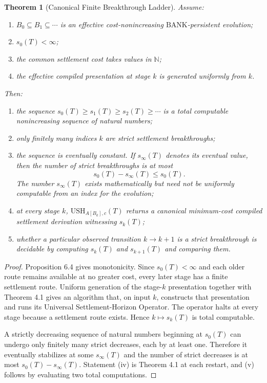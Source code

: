 \documentclass[11pt]{article}
\newtheorem{theorem}{Theorem}[section]
\theoremstyle{definition}
\newcommand{\BANK}{\ensuremath{\mathrm{BANK}}}
\newcommand{\USH}{\ensuremath{\mathrm{USH}}}
\begin{document}
\begin{theorem}[Canonical Finite Breakthrough Ladder]
Assume:
\begin{enumerate}[label=(\alph*)]
\item $B_0\subseteq B_1\subseteq\cdots$ is an effective cost-nonincreasing \BANK-persistent evolution;
\item $s_0(T)<\infty$;
\item the common settlement cost takes values in $\mathbb N$;
\item the effective compiled presentation at stage $k$ is generated uniformly from $k$.
\end{enumerate}
Then:
\begin{enumerate}[label=(\roman*)]
\item the sequence $s_0(T)\ge s_1(T)\ge s_2(T)\ge\cdots$ is a total computable nonincreasing sequence of natural numbers;
\item only finitely many indices $k$ are strict settlement breakthroughs;
\item the sequence is eventually constant. If $s_\infty(T)$ denotes its eventual value, then the number of strict breakthroughs is at most
\[
s_0(T)-s_\infty(T)\le s_0(T).
\]
The number $s_\infty(T)$ exists mathematically but need not be uniformly computable from an index for the evolution;
\item at every stage $k$, $\USH_{A[B_k],c}(T)$ returns a canonical minimum-cost compiled settlement derivation witnessing $s_k(T)$;
\item whether a particular observed transition $k\to k+1$ is a strict breakthrough is decidable by computing $s_k(T)$ and $s_{k+1}(T)$ and comparing them.
\end{enumerate}
\end{theorem}

\begin{proof}
Proposition 6.4 gives monotonicity. Since $s_0(T)<\infty$ and each older route remains available at no greater cost, every later stage has a finite settlement route. Uniform generation of the stage-$k$ presentation together with Theorem 4.1 gives an algorithm that, on input $k$, constructs that presentation and runs its Universal Settlement-Horizon Operator. The operator halts at every stage because a settlement route exists. Hence $k\mapsto s_k(T)$ is total computable.

A strictly decreasing sequence of natural numbers beginning at $s_0(T)$ can undergo only finitely many strict decreases, each by at least one. Therefore it eventually stabilizes at some $s_\infty(T)$ and the number of strict decreases is at most $s_0(T)-s_\infty(T)$. Statement (iv) is Theorem 4.1 at each restart, and (v) follows by evaluating two total computations.
\end{proof}
\end{document}
